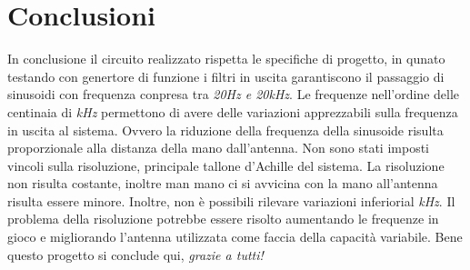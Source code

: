 \documentclass[titlepage]{report}
\begin{document}
\chapter{Conclusioni}
 	\label{ch:Conclusioni}
	In conclusione il circuito realizzato rispetta le specifiche di progetto, in qunato testando con genertore di funzione i filtri in uscita garantiscono il passaggio di sinusoidi con frequenza conpresa tra \textit{20Hz e 20kHz}. Le frequenze nell'ordine delle centinaia di \textit{kHz} permettono di avere delle variazioni apprezzabili sulla frequenza in uscita al sistema. Ovvero la riduzione della frequenza della sinusoide risulta proporzionale alla distanza della mano dall'antenna.
	Non sono stati imposti vincoli sulla risoluzione, principale tallone d'Achille del sistema. La risoluzione non risulta costante, inoltre man mano ci si avvicina con la mano all'antenna risulta essere minore. Inoltre, non è possibili rilevare variazioni inferiorial \textit{kHz}.
	Il problema della risoluzione potrebbe essere risolto aumentando le frequenze in gioco e migliorando l'antenna utilizzata come faccia della capacità variabile.
	Bene questo progetto si conclude qui, \textit{grazie a tutti!}
	




	
\end{document}
